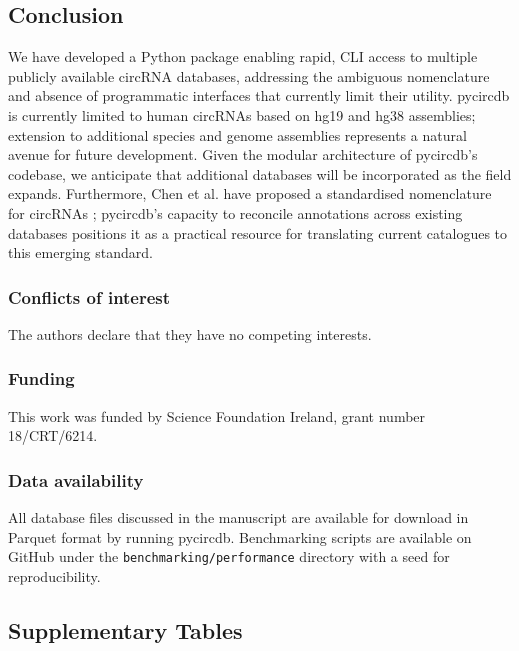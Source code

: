 \subsection{Conclusion}
We have developed a Python package enabling rapid, CLI access to multiple publicly available circRNA databases, addressing the ambiguous nomenclature and absence of programmatic interfaces that currently limit their utility. pycircdb is currently limited to human circRNAs based on hg19 and hg38 assemblies; extension to additional species and genome assemblies represents a natural avenue for future development. Given the modular architecture of pycircdb's codebase, we anticipate that additional databases will be incorporated as the field expands. Furthermore, Chen et al. have proposed a standardised nomenclature for circRNAs \cite{Chen2023Jan}; pycircdb's capacity to reconcile annotations across existing databases positions it as a practical resource for translating current catalogues to this emerging standard.



\subsubsection{Conflicts of interest}
The authors declare that they have no competing interests.

\subsubsection{Funding}
This work was funded by Science Foundation Ireland, grant number 18/CRT/6214.

\subsubsection{Data availability}
All database files discussed in the manuscript are available for download in Parquet format by running pycircdb. Benchmarking scripts are available on GitHub under the \texttt{benchmarking/performance} directory with a seed for reproducibility. 



\subsection{Supplementary Tables}

\renewcommand{\thefigure}{\chapternum.S\arabic{figure}}
\setcounter{figure}{0}

\renewcommand{\thetable}{\chapternum.S\arabic{table}}
\setcounter{table}{0}


